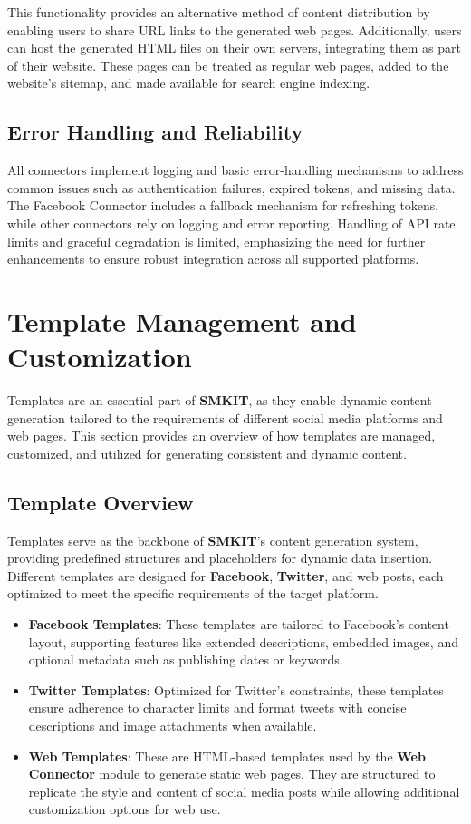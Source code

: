 This functionality provides an alternative method of content distribution by enabling users to share URL links to the generated web pages. Additionally, users can host the generated HTML files on their own servers, integrating them as part of their website. These pages can be treated as regular web pages, added to the website's sitemap, and made available for search engine indexing.

\subsection{Error Handling and Reliability}
\label{subsec:error_handling_reliability}
All connectors implement logging and basic error-handling mechanisms to address common issues such as authentication failures, expired tokens, and missing data. The Facebook Connector includes a fallback mechanism for refreshing tokens, while other connectors rely on logging and error reporting. Handling of API rate limits and graceful degradation is limited, emphasizing the need for further enhancements to ensure robust integration across all supported platforms.


\section{Template Management and Customization}
\label{sec:template_management_and_customization}
Templates are an essential part of \textbf{SMKIT}, as they enable dynamic content generation tailored to the requirements of different social media platforms and web pages. This section provides an overview of how templates are managed, customized, and utilized for generating consistent and dynamic content.

\subsection{Template Overview}
\label{subsec:template_overview}
Templates serve as the backbone of \textbf{SMKIT}'s content generation system, providing predefined structures and placeholders for dynamic data insertion. Different templates are designed for \textbf{Facebook}, \textbf{Twitter}, and web posts, each optimized to meet the specific requirements of the target platform.

\begin{itemize}
    \item \textbf{Facebook Templates}: These templates are tailored to Facebook's content layout, supporting features like extended descriptions, embedded images, and optional metadata such as publishing dates or keywords.
    \item \textbf{Twitter Templates}: Optimized for Twitter’s constraints, these templates ensure adherence to character limits and format tweets with concise descriptions and image attachments when available.
    \item \textbf{Web Templates}: These are HTML-based templates used by the \textbf{Web Connector} module to generate static web pages. They are structured to replicate the style and content of social media posts while allowing additional customization options for web use.
\end{itemize}

